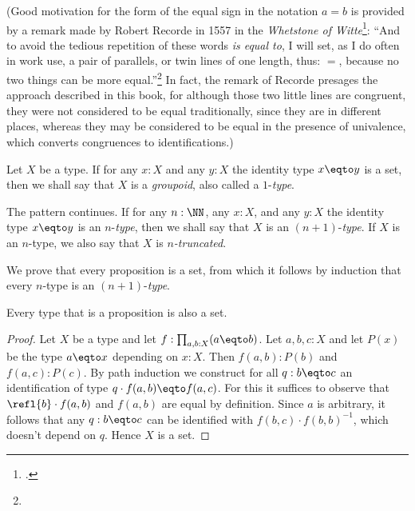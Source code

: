 (Good motivation for the form of the equal sign in the notation $a=b$ is provided by a remark made by Robert Recorde in 1557 in the \emph{Whetstone of Witte}\footcite{WhetstoneOfWitte}:
``And to avoid the tedious repetition of these words \emph{is equal to}, I will set,
as I do often in work use, a pair of parallels, or twin lines of one length, thus: $=$,
because no two things can be more equal.''\footnote{}
In fact, the remark of Recorde presages the approach described in this book, for although those two little lines are congruent,
they were not considered to be equal traditionally, since they are in different places, whereas they may be considered to be equal in the presence of univalence,
which converts congruences to identifications.)

Let $X$ be a type.
If for any $x:X$ and any $y:X$ the identity type $x \eqto y$ is a set,
then we shall say that $X$ is a \emph{groupoid},
also called a $1$-\emph{type}.

The pattern continues.  If for any $n:\NN$, any $x:X$, and any $y:X$
the identity type $x \eqto y$ is an $n$-\emph{type},
then we shall say that $X$ is an $(n+1)$-\emph{type}.
If $X$ is an $n$-type, we also say that $X$ is \emph{$n$-truncated}.

We prove that every proposition is a set, from which it follows
by induction that every $n$-type is an $(n+1)$-\emph{type}.

\begin{lemma}\label{lem:prop-is-set}
Every type that is a proposition is also a set.
\end{lemma}
\begin{proof}
Let $X$ be a type and let $f: \prod_{a,b:X} (a \eqto b)$. Let $a,b,c : X$ and
let $P(x)$ be the type $a \eqto x$ depending on $x:X$. Then
$f(a,b):P(b)$ and $f(a,c):P(c)$. By path induction we construct for
all $q:b \eqto c$ an identification of type $q\cdot f(a,b) \eqto f(a,c)$.
For this it suffices to observe that $\refl{b} \cdot f(a,b)$ and
$f(a,b)$ are equal by definition. Since $a$ is arbitrary,
it follows that any $q:b \eqto c$ can be identified with
$f(b,c)\cdot f(b,b)^{-1}$, which doesn't depend on $q$.
Hence $X$ is a set.
\end{proof}

